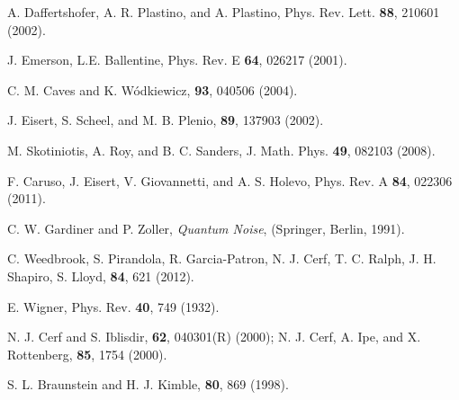 \documentclass[pra,superscriptaddress,nofootinbib,12pt]{revtex4-2}
\begin{document}
\begin{thebibliography}{9}
 A. Daffertshofer, A. R. Plastino, and A.
Plastino, Phys. Rev. Lett. \textbf{88}, 210601 (2002).




J. Emerson, L.E. Ballentine, Phys. Rev. E {\bf 64}, 026217 (2001).


 C. M. Caves and K. W{\'o}dkiewicz, \prl \textbf{93}, 040506 (2004).


 J. Eisert, S. Scheel, and M. B. Plenio, \prl \textbf{89}, 137903 (2002).



 M. Skotiniotis, A. Roy, and B. C. Sanders,
J. Math. Phys. \textbf{49}, 082103 (2008).

 F. Caruso, J. Eisert, V. Giovannetti, and A. S. Holevo, Phys. Rev. A \textbf{84}, 022306 (2011).

 C. W. Gardiner and P. Zoller, \textit{Quantum Noise}, (Springer, Berlin, 1991).

 C. Weedbrook, S. Pirandola, R. Garcia-Patron, N. J. Cerf, T. C. Ralph, J. H. Shapiro, S. Lloyd, \rmp \textbf{84}, 621 (2012).

 E. Wigner, Phys. Rev. \textbf{40}, 749 (1932).


 N. J. Cerf and S. Iblisdir, \pra \textbf{62}, 040301(R) (2000); N. J. Cerf, A. Ipe, and X. Rottenberg, \prl \textbf{85}, 1754 (2000).

 S. L. Braunstein and H. J. Kimble, \prl \textbf{80}, 869 (1998).


\end{thebibliography}
\end{document}
